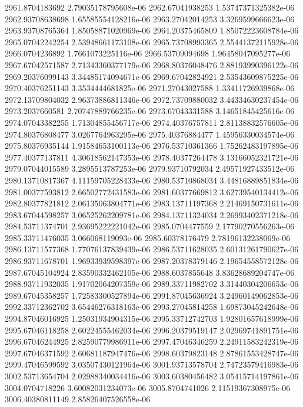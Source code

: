 {2961.8704183692 2.79035178795608e-06
2962.67041938253 1.53747371325382e-06
2962.93708638698 1.65585554128216e-06
2963.27042014253 3.3269599666623e-06
2963.93708765364 1.85058871020969e-06
2964.20375465809 1.85072223608784e-06
2965.07042242254 2.53948661173108e-06
2965.73708993365 2.55441372115928e-06
2966.0704236892 1.7661073225116e-06
2966.53709094698 1.96458047095277e-06
2967.67042571587 2.71343360377179e-06
2968.80376048476 2.88193990396122e-06
2969.20376099143 3.34485174094671e-06
2969.67042824921 2.53543609875225e-06
2970.40376251143 3.3534444681825e-06
2971.27043027588 1.33411726939868e-06
2972.13709804032 2.96373886811346e-06
2972.73709880032 3.44334630237454e-06
2973.2037660581 2.70747889766235e-06
2973.67043331588 3.14651845425616e-06
2974.07043382255 1.71304855456717e-06
2974.40376757811 2.81138832576605e-06
2974.80376808477 3.0267764963295e-06
2975.40376884477 1.45956330034574e-06
2975.80376935144 1.91584653100113e-06
2976.53710361366 1.75262483197895e-06
2977.40377137811 4.30618562147353e-06
2978.40377264478 3.13166052321721e-06
2979.07044015589 3.2895513787253e-06
2979.93710792034 2.49571927433512e-06
2980.13710817367 4.11159705228433e-06
2980.53710868034 3.44816889851834e-06
2981.00377593812 2.66502772431583e-06
2981.60377669812 3.62739540134412e-06
2982.80377821812 2.06135063804771e-06
2983.13711197368 2.21469150731611e-06
2983.67044598257 3.06525262209781e-06
2984.13711324034 2.26993402371218e-06
2984.53711374701 2.93695222221042e-06
2985.0704477559 2.17790270556263e-06
2985.33711476035 3.066068119093e-06
2985.60378176479 2.78196132238069e-06
2986.13711577368 1.77076137839439e-06
2986.53711628035 2.60131261790627e-06
2986.93711678701 1.96933939598397e-06
2987.20378379146 2.19654558572128e-06
2987.67045104924 2.83590332462105e-06
2988.6037855648 3.83628689204747e-06
2988.93711932035 1.91702064207359e-06
2989.33711982702 3.31440304206653e-06
2989.67045358257 1.72583300527894e-06
2991.87045636924 3.24960149062853e-06
2992.33712362702 3.65446276318163e-06
2993.27045814258 1.69873045242648e-06
2994.87046016925 1.25031934904315e-06
2995.33712742703 1.92801657618999e-06
2995.67046118258 2.60224555462034e-06
2996.20379519147 2.02969741891751e-06
2996.67046244925 2.82590779986911e-06
2997.47046346259 2.24911583242319e-06
2997.67046371592 2.60681187947476e-06
2998.60379823148 2.87861553428747e-06
2999.47046599592 3.03507430121964e-06
3001.93713578704 2.74723579416983e-06
3002.53713654704 2.02988340034416e-06
3003.60380456482 3.05415714197861e-06
3004.0704718226 3.60082031234073e-06
3005.8704741026 2.11519367308975e-06
3006.40380811149 2.85826407526558e-06
}
